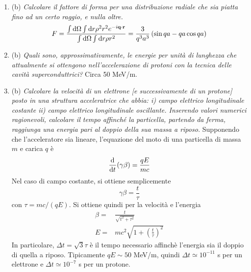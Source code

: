 \documentclass{article}
\renewcommand{\b}{(b)}
\renewcommand{\t}[1]{\textit{ #1}}
\renewcommand{\vec}[1]{\mathbf{#1}}
\begin{document}
\begin{enumerate}
	\item\b\t{Calcolare il fattore di forma per una distribuzione radiale che sia piatta fino ad un
		certo raggio, e nulla oltre.}
	\[F=\frac{\int \d \Omega \int\d r \rho^2r^2e^{-i\vec{q}\cdot\vec{r}}}{\int \d \Omega \int \d r\rho r^2}=\frac{3}{q^3a^3}\left(\sin qa-qa\cos qa\right)\]
	\item\b\t{Quali sono, approssimativamente, le energie per unità di lunghezza che
		attualmente si ottengono nell’accelerazione di protoni con la tecnica delle cavità
		superconduttrici?} Circa 50 MeV/m.
	\item\b\t{Calcolare la velocità di un elettrone [e successivamente di un protone] posto in
		una struttura acceleratrice che abbia: i) campo elettrico longitudinale costante ii)
		campo elettrico longitudinale oscillante. Inserendo valori numerici ragionevoli, calcolare il tempo affinché la particella, partendo da ferma, raggiunga una energia
		pari al doppio della sua massa a riposo.} Supponendo che l'acceleratore sia lineare, l'equazione del moto di una particella di massa $m$ e carica $q$ è
	\[\dfrac{\mathrm{d} ^{}}{\mathrm{d} {t}^{}}(\gamma\beta)=\frac{qE}{mc}\]
	Nel caso di campo costante, si ottiene semplicemente
	\[\gamma\beta=\frac{t}{\tau}\]
	con $\tau=mc/(qE)$. Si ottiene quindi per la velocità e l'energia
	\begin{align*}
		\beta=&\frac{t}{\sqrt{t^2+\tau^2}}\\E=&mc^2\sqrt{1+\left(\frac{t}{\tau}\right)^2}
	\end{align*}
	In particolare, $\Delta t=\sqrt{3}\tau$ è il tempo necessario affinchè l'energia sia il doppio di quella a riposo. Tipicamente $qE\sim 50$ MeV/m, quindi $\Delta t\simeq10^{-11}$ s per un elettrone e $\Delta t\simeq 10^{-7}$ s per un protone.
	

\end{enumerate}
\end{document}
